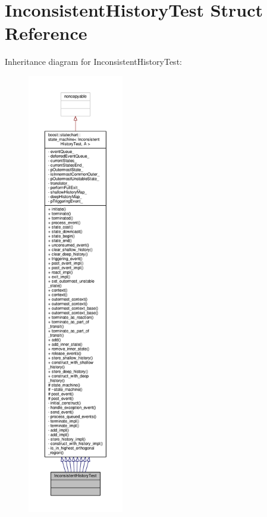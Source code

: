 \hypertarget{struct_inconsistent_history_test}{}\section{Inconsistent\+History\+Test Struct Reference}
\label{struct_inconsistent_history_test}


Inheritance diagram for Inconsistent\+History\+Test\+:
\nopagebreak
\begin{figure}[H]
\begin{center}
\leavevmode
\includegraphics[height=550pt]{struct_inconsistent_history_test__inherit__graph}
\end{center}
\end{figure}


